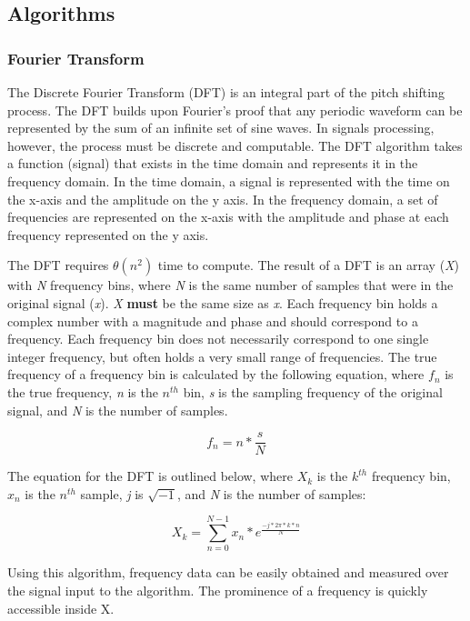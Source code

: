 \documentclass{article}
\begin{document}
\subsection{Algorithms}
\subsubsection{Fourier Transform}
The Discrete Fourier Transform (DFT) is an integral part of the pitch shifting process. The DFT builds upon Fourier's proof that any periodic waveform can be represented by the sum of an infinite set of sine waves. In signals processing, however, the process must be discrete and computable. The DFT algorithm takes a function (signal) that exists in the time domain and represents it in the frequency domain. In the time domain, a signal is represented with the time on the x-axis and the amplitude on the y axis. In the frequency domain, a set of frequencies are represented on the x-axis with the amplitude and phase at each frequency represented on the y axis.

The DFT requires $\theta(n^2)$ time to compute. The result of a DFT is an array (\textit{X}) with \textit{N} frequency bins, where \textit{N} is the same number of samples that were in the original signal (\textit{x}). \textit{X} \textbf{must} be the same size as \textit{x}. Each frequency bin holds a complex number with a magnitude and phase and should correspond to a frequency. Each frequency bin does not necessarily correspond to one single integer frequency, but often holds a very small range of frequencies. The true frequency of a frequency bin is calculated by the following equation, where $f_n$ is the true frequency, \textit{n} is the $n^{th}$ bin, \textit{s} is the sampling frequency of the original signal, and \textit{N} is the number of samples.

\begin{equation}
f_n = n * \frac{s}{N}
\end{equation}

The equation for the DFT is outlined below, where \textit{$X_k$} is the \textit{$k^{th}$} frequency bin, \textit{$x_n$} is the $n^{th}$ sample, \textit{j} is $\sqrt{-1}$, and \textit{N} is the number of samples:

\begin{equation}
X_k = \sum_{n=0}^{N-1} x_n * e^{\frac{-j*2\pi*k*n}{N}}
\end{equation}

Using this algorithm, frequency data can be easily obtained and measured over the signal input to the algorithm. The prominence of a frequency is quickly accessible inside X.
\end{document}
